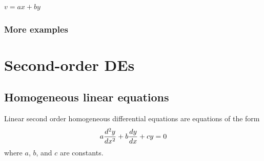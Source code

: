 \documentclass{book}
\begin{document}

$v = ax + by$


\newpage
\subsection{More examples}









\newpage
\chapter{Second-order DEs}


\newpage
\section{Homogeneous linear equations}

Linear second order homogeneous differential equations are equations
of the form
\begin{dmath}
  \label{eq:second_order_linear_homogeneous}
  a \ddtwo{y}{x} + b \dd{y}{x} + c y = 0
\end{dmath}
where $a$, $b$, and $c$ are constants.
\end{document}
